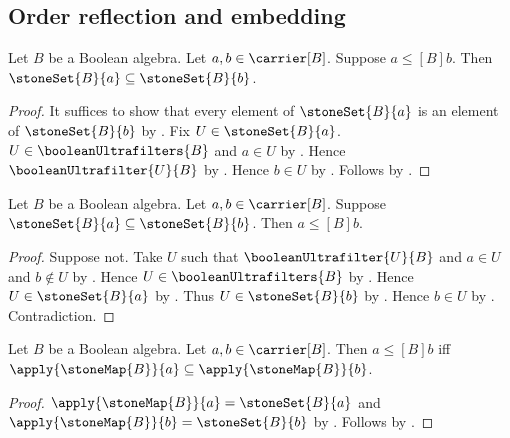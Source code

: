 \subsection{Order reflection and embedding}

\begin{proposition}\label{stone_set_monotone}
    Let $B$ be a Boolean algebra.
    Let $a,b\in\carrier[B]$.
    Suppose $a\mathrel{\leq[B]}b$.
    Then $\stoneSet{B}{a}\subseteq\stoneSet{B}{b}$.
\end{proposition}
\begin{proof}
    It suffices to show that every element of $\stoneSet{B}{a}$
        is an element of $\stoneSet{B}{b}$ by .
    Fix $U\in\stoneSet{B}{a}$.
    $U\in\booleanUltrafilters{B}$ and $a\in U$ by
        .
    Hence $\booleanUltrafilter{U}{B}$ by
        .
    Hence $b\in U$ by .
    Follows by .
\end{proof}

\begin{proposition}\label{stone_set_order_reflecting}
    Let $B$ be a Boolean algebra.
    Let $a,b\in\carrier[B]$.
    Suppose $\stoneSet{B}{a}\subseteq\stoneSet{B}{b}$.
    Then $a\mathrel{\leq[B]}b$.
\end{proposition}
\begin{proof}
    Suppose not.
    Take $U$ such that $\booleanUltrafilter{U}{B}$ and
        $a\in U$ and $b\notin U$ by
        .
    Hence $U\in\booleanUltrafilters{B}$ by
        .
    Hence $U\in\stoneSet{B}{a}$ by .
    Thus $U\in\stoneSet{B}{b}$ by .
    Hence $b\in U$ by .
    Contradiction.
\end{proof}

\begin{theorem}\label{stone_map_order_iff}
    Let $B$ be a Boolean algebra.
    Let $a,b\in\carrier[B]$.
    Then $a\mathrel{\leq[B]}b$ iff
        $\apply{\stoneMap{B}}{a}
            \subseteq\apply{\stoneMap{B}}{b}$.
\end{theorem}
\begin{proof}
    $\apply{\stoneMap{B}}{a}=\stoneSet{B}{a}$ and
        $\apply{\stoneMap{B}}{b}=\stoneSet{B}{b}$ by
        .
    Follows by
        .
\end{proof}

